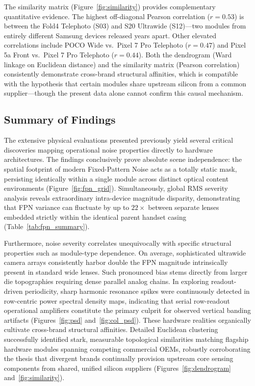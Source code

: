 \documentclass[conference]{IEEEtran}
\begin{document}
The similarity matrix (Figure~\ref{fig:similarity}) provides complementary quantitative evidence. The highest off-diagonal Pearson correlation ($r = 0.53$) is between the Fold4 Telephoto (S03) and S20 Ultrawide (S12)---two modules from entirely different Samsung devices released years apart. Other elevated correlations include POCO Wide vs.\ Pixel 7 Pro Telephoto ($r = 0.47$) and Pixel 5a Front vs.\ Pixel 7 Pro Telephoto ($r = 0.44$). Both the dendrogram (Ward linkage on Euclidean distance) and the similarity matrix (Pearson correlation) consistently demonstrate cross-brand structural affinities, which is compatible with the hypothesis that certain modules share upstream silicon from a common supplier---though the present data alone cannot confirm this causal mechanism.

\subsection{Summary of Findings}

The extensive physical evaluations presented previously yield several critical discoveries mapping operational noise properties directly to hardware architectures. The findings conclusively prove absolute scene independence: the spatial footprint of modern Fixed-Pattern Noise acts as a totally static mask, persisting identically within a single module across distinct optical content environments (Figure~\ref{fig:fpn_grid}). Simultaneously, global RMS severity analysis reveals extraordinary intra-device magnitude disparity, demonstrating that FPN variance can fluctuate by up to $22\times$ between separate lenses embedded strictly within the identical parent handset casing (Table~\ref{tab:fpn_summary}). 

Furthermore, noise severity correlates unequivocally with specific structural properties such as module-type dependence. On average, sophisticated ultrawide camera arrays consistently harbor double the FPN magnitude intrinsically present in standard wide lenses. Such pronounced bias stems directly from larger die topographies requiring dense parallel analog chains. In exploring readout-driven periodicity, sharp harmonic resonance spikes were continuously detected in row-centric power spectral density maps, indicating that serial row-readout operational amplifiers constitute the primary culprit for observed vertical banding artifacts (Figures~\ref{fig:psd} and~\ref{fig:col_psd}). These hardware realities organically cultivate cross-brand structural affinities. Detailed Euclidean clustering successfully identified stark, measurable topological similarities matching flagship hardware modules spanning competing commercial OEMs, robustly corroborating the thesis that divergent brands continually provision upstream core sensing components from shared, unified silicon suppliers (Figures~\ref{fig:dendrogram} and~\ref{fig:similarity}).
\end{document}
